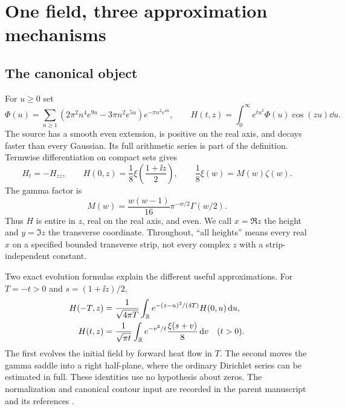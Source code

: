 \section{One field, three approximation mechanisms}
\label{sec:canonical}

\subsection{The canonical object}
For $u\ge0$ set
\begin{equation}
 \Phi(u)=\sum_{n\ge1}
 (2\pi^2n^4e^{9u}-3\pi n^2e^{5u})e^{-\pi n^2e^{4u}},
 \qquad H(t,z)=\int_0^\infty e^{tu^2}\Phi(u)\cos(zu)\dd u.
 \label{eq:source}
\end{equation}
The source has a smooth even extension, is positive on the real axis,
and decays faster than every Gaussian. Its full arithmetic series is
part of the definition. Termwise differentiation on compact sets gives
\begin{equation}
 H_t=-H_{zz},\qquad
 H(0,z)=\frac18\xi\left(\frac{1+\ii z}{2}\right),\qquad
 \frac18\xi(w)=M(w)\zeta(w).
 \label{eq:normalization}
\end{equation}
The gamma factor is
\[
 M(w)=\frac{w(w-1)}{16}\pi^{-w/2}\Gamma(w/2).
 \]
Thus $H$ is entire in $z$, real on the real axis, and even. We call
$x=\Re z$ the height and $y=\Im z$ the transverse coordinate.
Throughout, ``all heights'' means every real $x$ on a specified bounded
transverse strip, not every complex $z$ with a strip-independent constant.

Two exact evolution formulas explain the different useful approximations.
For $T=-t>0$ and $s=(1+\ii z)/2$,
\begin{align}
 H(-T,z)&=\frac1{\sqrt{4\pi T}}
   \int_\mathbb R e^{-(z-u)^2/(4T)}H(0,u)\,\mathrm d u,\label{eq:negative-heat}\\
 H(t,z)&=\frac1{\sqrt{\pi t}}
   \int_\mathbb R e^{-v^2/t}\frac{\xi(s+v)}8\,\mathrm d v\quad(t>0).
 \label{eq:positive-heat}
\end{align}
The first evolves the initial field by forward heat flow in $T$.
The second moves the gamma saddle into a right half-plane, where the
ordinary Dirichlet series can be estimated in full. These identities
use no hypothesis about zeros. The normalization and canonical contour
input are recorded in the parent manuscript and its references
\cite{parent,positive,poly}.

